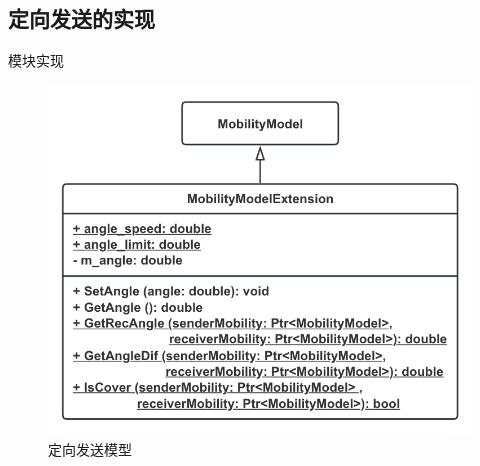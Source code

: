 \documentclass{beamer}
\begin{document}
\subsection{定向发送的实现}
\begin{frame}{模块实现}
	\begin{figure}[h]
		\centering
		\includegraphics[height=0.8\textheight]{pic/MobilityModel.png}
		\caption{定向发送模型}
	\end{figure}
\end{frame}

\end{document}
